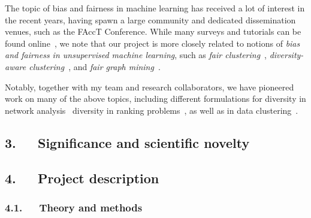 \documentclass[a4paper,11pt]{article}
\begin{document}

The topic of bias and fairness in machine learning has received a lot of interest in the recent years, 
having spawn a large community and dedicated dissemination venues, such as the FAccT Conference. 
While many surveys and tutorials can be found online~\cite{caton2020fairness,mehrabi2021survey}, 
we note that our project is more closely related to notions of
\emph{bias and fairness in unsupervised machine learning}, 
such as 
\emph{fair clustering}~\cite{chierichetti2017fair}, 
\emph{diversity-aware clustering}~\cite{thejaswi2021diversity}, 
and \emph{fair graph mining}~\cite{dong2023fairness}.


Notably, together with my team and research collaborators, 
we have pioneered work on many of the above topics,
including
different formulations for diversity in network analysis~\cite{adriaens2023minimizing,cinus2023rebalancing,coupette2023reducing,oettershagen2024finding}
diversity in ranking problems~\cite{zhang2022ranking}, 
as well as in data clustering~\cite{thejaswi2021diversity}.

\subsection*{3.~~~Significance and scientific novelty}



\subsection*{4.~~~Project description}


\subsubsection*{4.1.~~~Theory and methods}
\end{document}
